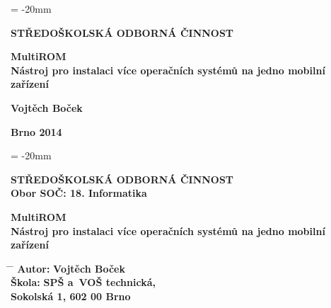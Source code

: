 \documentclass[12pt, a4paper, oneside]{article}
\newcommand{\B}{\textbf} %
\begin{document}
\pagestyle{empty} %

\voffset = -20mm %
\enlargethispage{60mm} %

\begin{center}
 
\Large \B{STŘEDOŠKOLSKÁ ODBORNÁ ČINNOST}

\vspace{60mm}

\Huge
\B{MultiROM} \\
\LARGE
\B{Nástroj pro instalaci více operačních systémů na jedno mobilní zařízení}

\Large

\vspace{90mm}


\B{Vojtěch Boček} \\

\vspace{40mm}

\B{Brno 2014}


\end{center}

\newpage %

\voffset = -20mm %
\enlargethispage{60mm} %

\begin{center}

\Large \B{STŘEDOŠKOLSKÁ ODBORNÁ ČINNOST}  \\
\vspace{10mm}
 \normalsize 
\B{Obor SOČ: 18. Informatika}

\vspace{45mm}

\Huge
\B{MultiROM} \\
\LARGE
\B{Nástroj pro instalaci více operačních systémů na jedno mobilní zařízení}
\end{center}
\large

\vspace{50mm}


\begin{tabbing}
\hspace{10mm} \= \hspace{30mm}  \=   \kill %
  \> \B{Autor:}  \> \B{Vojtěch Boček}        \\[8mm] 
  \> \B{Škola:}   \> \B{SPŠ a~VOŠ technická, }     \\
  \>              \> \B{Sokolská 1, 602 00 Brno}    \\[8mm]
\end{tabbing}
\end{document}
